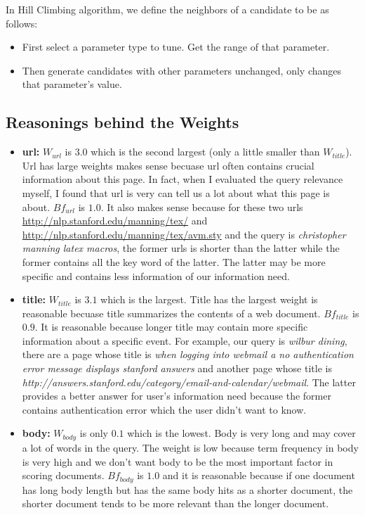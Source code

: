 \documentclass{article}
\begin{document}
In Hill Climbing algorithm, we define the neighbors of a candidate to be as follows:
\begin{itemize}
  \item First select a parameter type to tune. Get the range of that parameter.
  \item Then generate candidates with other parameters unchanged, only changes that parameter's value.
\end{itemize}

\subsection{Reasonings behind the Weights}

\begin{itemize}
  \item \textbf{url:} $W_{url}$ is $3.0$ which is the second largest (only a little smaller than $W_{title}$). Url has large weights makes sense becuase url often contains crucial information about this page. In fact, when I evaluated the query relevance myself, I found that url is very can tell us a lot about what this page is about. $Bf_{url}$ is $1.0$. It also makes sense because for these two urls \url{http://nlp.stanford.edu/manning/tex/} and \url{http://nlp.stanford.edu/manning/tex/avm.sty} and the query is \textit{christopher manning latex macros}, the former urls is shorter than the latter while the former contains all the key word of the latter. The latter may be more specific and contains less information of our information need.
  \item \textbf{title:} $W_{title}$ is $3.1$ which is the largest. Title has the largest weight is reasonable becuase title summarizes the contents of a web document. $Bf_{title}$ is $0.9$. It is reasonable because longer title may contain more specific information about a specific event. For example, our query is \textit{ wilbur dining}, there are a page whose title is \textit{when logging into webmail a no authentication error message displays stanford answers} and another page whose title is \textit{http://answers.stanford.edu/category/email-and-calendar/webmail}. The latter provides a better answer for user's information need because the former contains authentication error which the user didn't want to know.
  \item \textbf{body:} $W_{body}$ is only $0.1$ which is the lowest. Body is very long and may cover a lot of words in the query. The weight is low because term frequency in body is very high and we don't want body to be the most important factor in scoring documents. $Bf_{body}$ is $1.0$ and it is reasonable because if one document has long body length but has the same body hits as a shorter document, the shorter document tends to be more relevant than the longer document.

\end{itemize}
\end{document}
